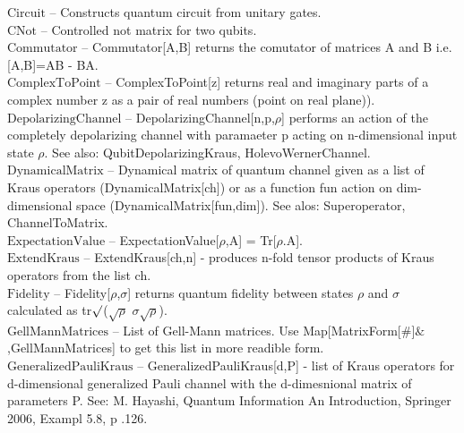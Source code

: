 \documentclass[a4paper,11pt]{article}
\begin{document}
\textbf{$ \text{Circuit} $ }-- Constructs quantum circuit from unitary gates.$  $\\

\textbf{$ \text{CNot} $ }-- Controlled not matrix for two qubits.$  $\\

\textbf{$ \text{Commutator} $ }-- Commutator[A,B] returns the comutator of matrices A and B i.e. [A,B]=AB - BA.$  $\\

\textbf{$ \text{ComplexToPoint} $ }-- ComplexToPoint[z] returns real and imaginary parts of a complex number z as a pair of real numbers (point on real plane)).$  $\\

\textbf{$ \text{DepolarizingChannel} $ }-- DepolarizingChannel[n,p,$\rho $] performs an action of the completely depolarizing channel with paramaeter p acting on n-dimensional input state $\rho $. See also: QubitDepolarizingKraus, HolevoWernerChannel.$  $\\

\textbf{$ \text{DynamicalMatrix} $ }-- Dynamical matrix of quantum channel given as a list of Kraus operators (DynamicalMatrix[ch]) or as a function fun action on dim-dimensional space (DynamicalMatrix[fun,dim]). See alos: Superoperator, ChannelToMatrix.$  $\\

\textbf{$ \text{ExpectationValue} $ }-- ExpectationValue[$\rho $,A] = Tr[$\rho $.A].$  $\\

\textbf{$ \text{ExtendKraus} $ }-- ExtendKraus[ch,n] - produces n-fold tensor products of Kraus operators from the list ch.$  $\\

\textbf{$ \text{Fidelity} $ }-- Fidelity[$\rho $,$\sigma $] returns quantum fidelity between states $\rho $ and $\sigma $ calculated as tr$\surd $($\surd \rho $ $\sigma \surd \rho $).$  $\\

\textbf{$ \text{GellMannMatrices} $ }-- List of Gell-Mann matrices. Use Map[MatrixForm[$\#$]$\&$,GellMannMatrices] to get this list in more readible form.$  $\\

\textbf{$ \text{GeneralizedPauliKraus} $ }-- GeneralizedPauliKraus[d,P] - list of Kraus operators for d-dimensional generalized Pauli channel with the d-dimesnional matrix of parameters P. See: M. Hayashi, Quantum Information An Introduction, Springer 2006, Exampl 5.8, p .126.$  $\\
\end{document}

